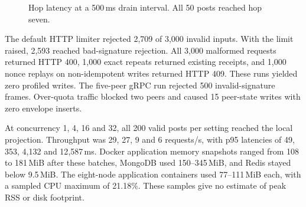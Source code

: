 \documentclass[conference,a4paper,10pt]{IEEEtran}
\begin{document}
\begin{figure}[t]
  \centering
  \caption{Hop latency at a 500\,ms drain interval. All 50 posts reached hop seven.}
  \label{fig:chain}
\end{figure}

The default HTTP limiter rejected 2,709 of 3,000 invalid inputs. With the limit raised, 2,593 reached bad-signature rejection. All 3,000 malformed requests returned HTTP 400, 1,000 exact repeats returned existing receipts, and 1,000 nonce replays on non-idempotent writes returned HTTP 409. These runs yielded zero profiled writes. The five-peer gRPC run rejected 500 invalid-signature frames. Over-quota traffic blocked two peers and caused 15 peer-state writes with zero envelope inserts.

At concurrency 1, 4, 16 and 32, all 200 valid posts per setting reached the local projection. Throughput was 29, 27, 9 and 6 requests/s, with p95 latencies of 49, 353, 4{,}132 and 12{,}587\,ms. Docker application memory snapshots ranged from 108 to 181\,MiB after these batches, MongoDB used 150--345\,MiB, and Redis stayed below 9.5\,MiB. The eight-node application containers used 77--111\,MiB each, with a sampled CPU maximum of 21.18\%. These samples give no estimate of peak RSS or disk footprint.
\end{document}
